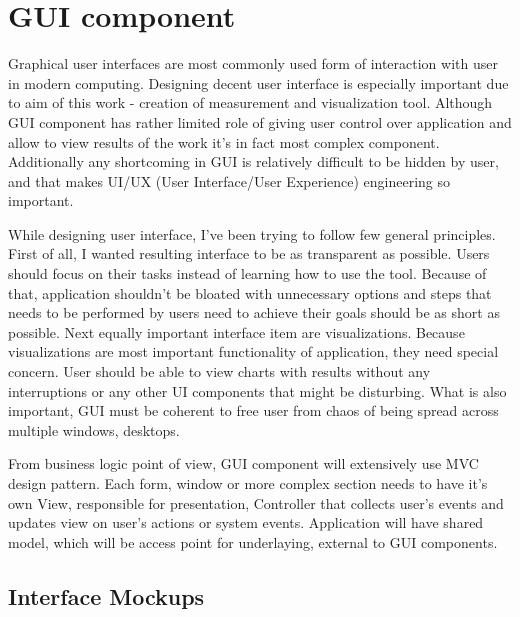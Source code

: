  
%


\section{GUI component}
\label{sec:arch_gui}

Graphical user interfaces are most commonly used form of interaction with user in modern computing. Designing decent
user interface is especially important due to aim of this work - creation of measurement and visualization tool. Although GUI component has rather limited role of giving user control over application and allow to view results of the work it's in fact most complex component. Additionally any shortcoming in GUI is relatively difficult to be hidden by user, and that makes UI/UX (User Interface/User Experience) engineering so important.

While designing user interface, I've been trying to follow few general principles. First of all, I wanted resulting
interface to be as transparent as possible. Users should focus on their tasks instead of learning how to use the tool. Because of that, application shouldn't be bloated with unnecessary options and steps that needs to be performed by users need to achieve their goals should be as short as possible. Next equally important interface item are visualizations. Because visualizations are most important functionality of application, they need special concern. User should be able to view charts with results without any interruptions or any other UI components that might be disturbing. What is also important, GUI must be coherent to free user from chaos of being spread across multiple windows, desktops. 

From business logic point of view, GUI component will extensively use MVC design pattern\cite{gamma1995}. Each form,
window or more complex section needs to have it's own View, responsible for presentation, Controller that collects
user's events and updates view on user's actions or system events. Application will have shared model, which will be
access point for underlaying, external to GUI components.
 

\subsection{Interface Mockups}

